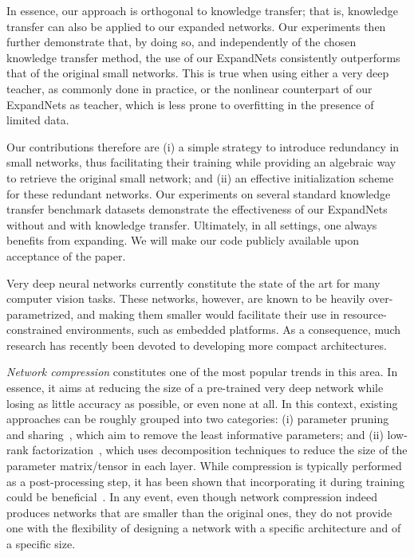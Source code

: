 \documentclass[10pt,twocolumn,letterpaper]{article}
\begin{document}
In essence, our approach is orthogonal to knowledge transfer; that is, knowledge transfer can also be applied to our expanded networks. Our experiments then further demonstrate that, by doing so, and independently of the chosen knowledge transfer method, the use of our ExpandNets consistently outperforms that of the original small networks. This is true when using either a very deep teacher, as commonly done in practice, or the nonlinear counterpart of our ExpandNets as teacher, which is less prone to overfitting in the presence of limited data.


Our contributions therefore are (i) a simple strategy to introduce redundancy in small networks, thus facilitating their training while providing an algebraic way to retrieve the original small network; and (ii) an effective initialization scheme for these redundant networks. Our experiments on several standard knowledge transfer benchmark datasets demonstrate the effectiveness of our ExpandNets without and with knowledge transfer. Ultimately, in all settings, one always benefits from expanding.
We will make our code publicly available upon acceptance of the paper.

Very deep neural networks currently constitute the state of the art for many computer vision tasks. These networks, however, are known to be heavily over-parametrized, and making them smaller would facilitate their use in resource-constrained environments, such as embedded platforms. As a consequence, much research has recently been devoted to developing more compact architectures.

{\it Network compression} constitutes one of the most popular trends in this area. In essence, it aims at reducing the size of a pre-trained very deep network while losing as little accuracy as possible, or even none at all. In this context, existing approaches can be roughly grouped into two categories: (i) parameter pruning and sharing~\cite{optBrainDamage,han2015deep, courbariaux1602binarynet,Kohli2016,Pavlo2017,SoftWeightSharing17,Carreira2018}, which aim to remove the least informative parameters; and (ii) low-rank factorization~\cite{denil2013predicting, sainath2013low,CPDecICLR2015}, which uses decomposition techniques to reduce the size of the parameter matrix/tensor in each layer. While compression is typically performed as a post-processing step, it has been shown that incorporating it during training could be beneficial~\cite{Alvarez16,Alvarez17,wen2016learning,Wen2017CoordinatingFF}. In any event, even though network compression indeed produces networks that are smaller than the original ones, they do not provide one with the flexibility of designing a network with a specific architecture and of a specific size.
\end{document}
